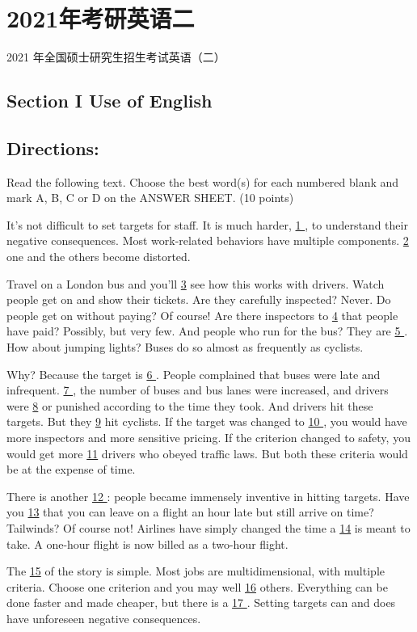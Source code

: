 \documentclass[UTF8,11pt]{ctexart}
\begin{document}
\section*{2021年考研英语二}
2021 年全国硕士研究生招生考试英语（二）


\subsection*{\textbf{Section I Use of English}}


\subsection*{\textbf{Directions:}}


Read the following text. Choose the best word(s) for each numbered blank and mark A, B, C or D on the ANSWER SHEET. (10 points)


It’s not difficult to set targets for staff. It is much harder, \uline{1 }, to understand their negative consequences. Most work-related behaviors have multiple components. \uline{2} one and the others become distorted.


Travel on a London bus and you’ll \uline{3} see how this works with drivers. Watch people get on and show their tickets. Are they carefully inspected? Never. Do people get on without paying? Of course! Are there inspectors to \uline{4} that people have paid? Possibly, but very few. And people who run for the bus? They are \uline{5 }. How about jumping lights? Buses do so almost as frequently as cyclists.


Why? Because the target is \uline{6 }. People complained that buses were late and infrequent. \uline{7 }, the number of buses and bus lanes were increased, and drivers were \uline{8} or punished according to the time they took. And drivers hit these targets. But they \uline{9} hit cyclists. If the target was changed to \uline{10 }, you would have more inspectors and more sensitive pricing. If the criterion changed to safety, you would get more \uline{11} drivers who obeyed traffic laws. But both these criteria would be at the expense of time.


There is another \uline{12 }: people became immensely inventive in hitting targets. Have you \uline{13} that you can leave on a flight an hour late but still arrive on time? Tailwinds? Of course not! Airlines have simply changed the time a \uline{14} is meant to take. A one-hour flight is now billed as a two-hour flight.


The \uline{15} of the story is simple. Most jobs are multidimensional, with multiple criteria. Choose one criterion and you may well \uline{16} others. Everything can be done faster and made cheaper, but there is a \uline{17 }. Setting targets can and does have unforeseen negative consequences.
\end{document}
